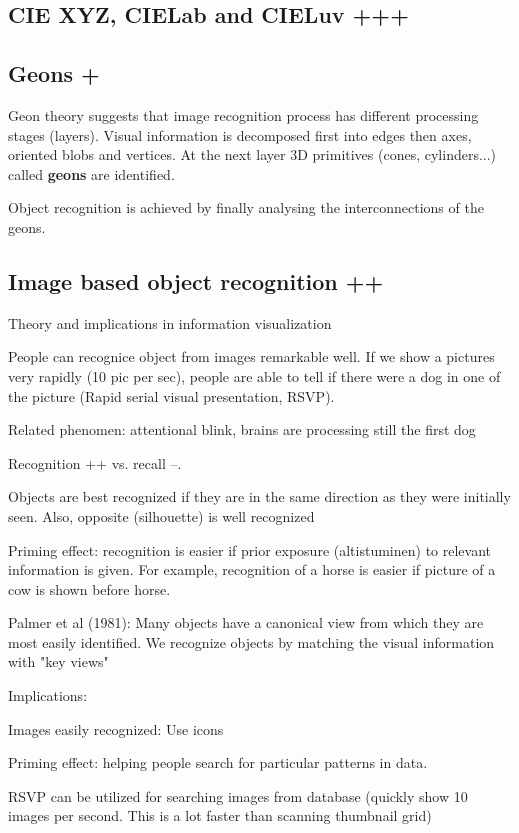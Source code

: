 \documentclass[a4paper]{article}
\begin{document}
\subsection{CIE XYZ, CIELab and CIELuv +++}

\subsection{Geons +}

Geon theory suggests that image recognition process has different processing stages (layers). Visual information is decomposed first into edges then axes, oriented blobs and vertices. At the next layer 3D primitives (cones, cylinders...) called \textbf{geons} are identified.

Object recognition is achieved by finally analysing the interconnections of the geons.

\subsection{Image based object recognition ++}

Theory and implications in information visualization

People can recognice object from images remarkable well. If we show a pictures very rapidly (10 pic per sec), people are able to tell if there were a dog in one of the picture (Rapid serial visual presentation, RSVP).

Related phenomen: attentional blink, brains are processing still the first dog

Recognition ++ vs. recall --.

Objects are best recognized if they are in the same direction as they were initially seen. Also, opposite (silhouette) is well recognized

Priming effect: recognition is easier if prior exposure (altistuminen) to relevant information is given. For example, recognition of a horse is easier if picture of a cow is shown before horse.

Palmer et al (1981): Many objects have a canonical view from which they are most easily identified. We recognize objects by matching the visual information with "key views"

Implications:

Images easily recognized: Use icons

Priming effect: helping people search for particular patterns in data.

RSVP can be utilized for searching images from database (quickly show 10 images per second. This is a lot faster than scanning thumbnail grid)
\end{document}
